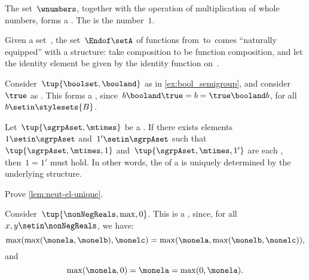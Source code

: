 \begin{example}
    The set~$\wnumbers$, together with the operation of multiplication of whole numbers, forms a .
    The  is the number~$1$.
\end{example}

\begin{example}
    Given a set~\setA, the set~$\Endof\setA$ of functions from~\setA to~\setA comes ``naturally equipped'' with a  structure: take  composition to be function composition, and let the identity element be given by the identity function on~\setA.
\end{example}

\begin{example}
    \label{ex:bool_monoid}
    Consider~$\tup{\boolset,\booland}$ as in \cref{ex:bool_semigroup}, and consider~$\true$ as .
    This forms a , since~$b\booland \true=b=\true \booland b$, for all~$b\setin \stylesets{B}$.
\end{example}

\begin{lemma}
    \label{lem:neut-el-unique}
    Let~$\tup{\sgrpAset, \mtimes}$ be a .
    If there exists elements~$1 \setin \sgrpAset$ and~$1' \setin \sgrpAset$ such that~$\tup{\sgrpAset, \mtimes, 1}$ and~$\tup{\sgrpAset, \mtimes, 1'}$ are each , then~$1 = 1'$ must hold.
    In other words, the  of a  is uniquely determined by the underlying  structure.
\end{lemma}

\begin{gradedexercise}
    \label{ex:UniqueNeutralMonoid}
    Prove \cref{lem:neut-el-unique}.
\end{gradedexercise}


\begin{example}
    Consider~$\tup{\nonNegReals,\max,0}$.
    This is a , since, for all~$x,y\setin \nonNegReals$, we have:
    \begin{equation}
        \max(\max(\monela,\monelb),\monelc)=\max(\monela,\max(\monelb,\monelc)),
    \end{equation}
    and
    \begin{equation}
        \max(\monela,0)=\monela=\max(0,\monela).
    \end{equation}
\end{example}

